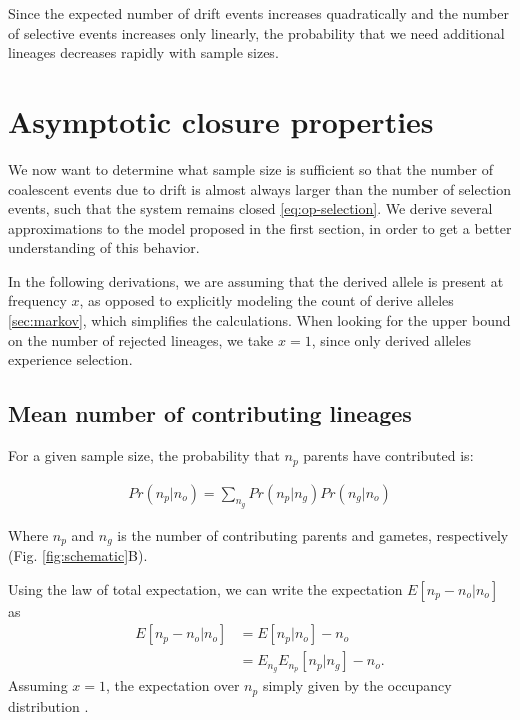 \documentclass[review]{elsarticle}
\begin{document}
Since the expected number of drift events increases quadratically and the number of selective events
increases only linearly, the probability that we need additional lineages decreases rapidly with
sample sizes.

\section{Asymptotic closure properties}
\label{sec:asympt}

We now want to determine what sample size is sufficient so that the number of coalescent events due
to drift is almost always larger than the number of selection events, such that the system remains
closed \eqref{eq:op-selection}. We derive several approximations to the model proposed in the first
section, in order to get a better understanding of this behavior.

In the following derivations, we are assuming that the derived allele is present at frequency $x$,
as opposed to explicitly modeling the count of derive alleles \ref{sec:markov}, which simplifies the
calculations. When looking for the upper bound on the number of rejected lineages, we take $x=1$,
since only derived alleles experience selection.

\subsection{Mean number of contributing lineages}
\label{sec:mean-contr}


For a given sample size, the probability that $n_p$ parents have contributed is:

\begin{align}
  \label{eq:conditional}
  Pr(n_p | n_o) = \sum_{n_g} Pr(n_p | n_g)Pr(n_g | n_o)
\end{align}

Where $n_p$ and $n_g$ is the number of contributing parents and gametes, respectively (Fig.
\ref{fig:schematic}B). %

Using the law of total expectation, we can write the expectation $E[n_p-n_o | n_o]$ as 
\begin{equation*}
  \begin{aligned}
    \label{eq:lineages-approx}
    E[n_p -n_o | n_o] &= E[n_p | n_o] - n_o \\
    &=E_{n_g} E_{n_p}[n_p | n_g] -n_o.
  \end{aligned}
\end{equation*}
Assuming $x=1$, the expectation over $n_p$ simply given by the occupancy distribution \cite{}. 
\end{document}
